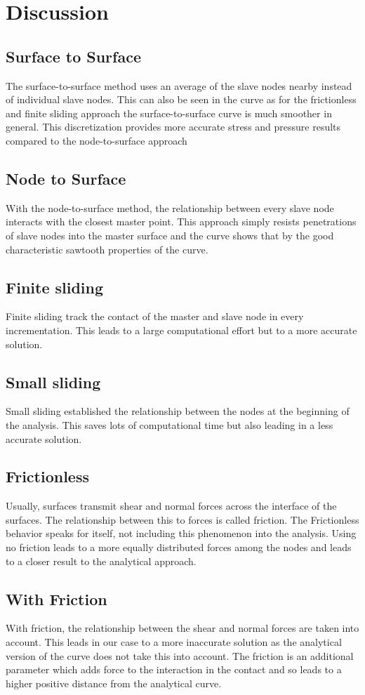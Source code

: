 \documentclass[12pt]{article}
\begin{document}
\newpage

\section{Discussion}

\subsection{Surface to Surface}
The surface-to-surface method uses an average of the slave nodes nearby instead of individual slave nodes. This can also be seen in the curve as for the frictionless and finite sliding approach the surface-to-surface curve is much smoother in general. This discretization provides more accurate stress and pressure results compared to the node-to-surface approach
\subsection{Node to Surface}
With the node-to-surface method, the relationship between every slave node interacts with the closest master point. This approach simply resists penetrations of slave nodes into the master surface and the curve shows that by the good characteristic sawtooth properties of the curve.
\subsection{Finite sliding}
Finite sliding track the contact of the master and slave node in every incrementation. This leads to a large computational effort but to a more accurate solution.
\subsection{Small sliding}
Small sliding established the relationship between the nodes at the beginning of the analysis. This saves lots of computational time but also leading in a less accurate solution.
\subsection{Frictionless}
Usually, surfaces transmit shear and normal forces across the interface of the surfaces. The relationship between this to forces is called friction. The Frictionless behavior speaks for itself, not including this phenomenon into the analysis. Using no friction leads to a more equally distributed forces among the nodes and leads to a closer result to the analytical approach.
\subsection{With Friction}
With friction, the relationship between the shear and normal forces are taken into account. This leads in our case to a more inaccurate solution as the analytical version of the curve does not take this into account. The friction is an additional parameter which adds force to the interaction in the contact and so leads to a higher positive distance from the analytical curve.
\end{document}

